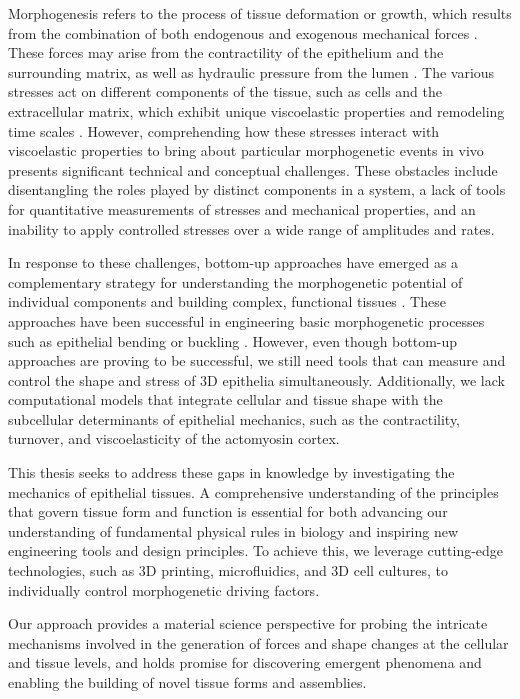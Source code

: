 Morphogenesis refers to the process of tissue deformation or growth, which results from the combination of both endogenous and exogenous mechanical forces \cite{valet2022, collinet2021}. These forces may arise from the contractility of the epithelium and the surrounding matrix, as well as hydraulic pressure from the lumen \cite{torres-sanchez2021, chan2020}. The various stresses act on different components of the tissue, such as cells and the extracellular matrix, which exhibit unique viscoelastic properties and remodeling time scales \cite{cavanaugh2020, kelkar2020, ambrosi2019}. However, comprehending how these stresses interact with viscoelastic properties to bring about particular morphogenetic events in vivo presents significant technical and conceptual challenges. These obstacles include disentangling the roles played by distinct components in a system, a lack of tools for quantitative measurements of stresses and mechanical properties, and an inability to apply controlled stresses over a wide range of amplitudes and rates.

In response to these challenges, bottom-up approaches have emerged as a complementary strategy for understanding the morphogenetic potential of individual components and building complex, functional tissues \cite{trentesaux2023, ingber2018}. These approaches have been successful in engineering basic morphogenetic processes such as epithelial bending or buckling \cite{matejcic2022}. However, even though bottom-up approaches are proving to be successful, we still need tools that can measure and control the shape and stress of 3D epithelia simultaneously. Additionally, we lack computational models that integrate cellular and tissue shape with the subcellular determinants of epithelial mechanics, such as the contractility, turnover, and viscoelasticity of the actomyosin cortex.

This thesis seeks to address these gaps in knowledge by investigating the mechanics of epithelial tissues. A comprehensive understanding of the principles that govern tissue form and function is essential for both advancing our understanding of fundamental physical rules in biology and inspiring new engineering tools and design principles. To achieve this, we leverage cutting-edge technologies, such as 3D printing, microfluidics, and 3D cell cultures, to individually control morphogenetic driving factors. 

Our approach provides a material science perspective for probing the intricate mechanisms involved in the generation of forces and shape changes at the cellular and tissue levels, and holds promise for discovering emergent phenomena and enabling the building of novel tissue forms and assemblies.  
